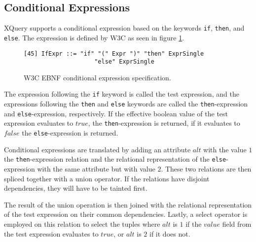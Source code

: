 \subsection{Conditional Expressions}
\label{sect:trans:TD:ifThenElse}
XQuery supports a conditional expression based on the keywords \texttt{if}, \texttt{then}, and \texttt{else}. The
expression is defined by W3C as seen in figure \ref{fig:trans:TD:condEBNF}.

\begin{figure}[h]
\begin{Verbatim}
[45] IfExpr ::= "if" "(" Expr ")" "then" ExprSingle 
                    "else" ExprSingle
\end{Verbatim}
\label{fig:trans:TD:condEBNF}
\caption{W3C EBNF conditional expression specification.}
\end{figure}

The expression following the \texttt{if} keyword is called the test expression, and the expressions following the
\texttt{then} and \texttt{else} keywords are called the \texttt{then}-expression and \texttt{else}-expression,
respectively. If the effective boolean value of the test expression evaluates to $true$, the
\texttt{then}-expression is returned, if it evaluates to $false$ the \texttt{else}-expression is returned.

Conditional expressions are translated by adding an attribute $alt$ with the value $1$ the
\texttt{then}-expression relation and the relational representation of the \texttt{else}-expression with the same
attribute but with value $2$. These two relations are then spliced together with a \textsf{union} operator. If the
relations have disjoint dependencies, they will have to be tainted first.

The result of the \textsf{union} operation is then joined with the relational representation of the test
expression on their common dependencies. Lastly, a \textsf{select} operator is employed on this relation to select
the tuples where $alt$ is $1$ if the $value$ field from the test expression evaluates to $true$, or $alt$ is $2$
if it does not.

